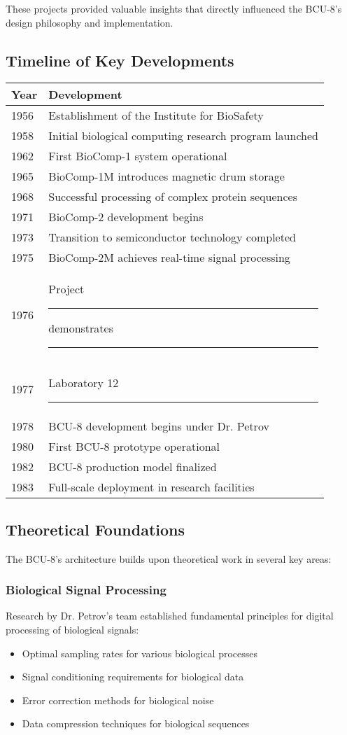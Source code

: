 \documentclass[12pt]{article}
\begin{document}
These projects provided valuable insights that directly influenced the BCU-8's design philosophy and implementation.

\subsection{Timeline of Key Developments}
\begin{center}
\begin{tabular}{|l|l|}
\hline
\textbf{Year} & \textbf{Development} \\
\hline
1956 & Establishment of the Institute for BioSafety \\
1958 & Initial biological computing research program launched \\
1962 & First BioComp-1 system operational \\
1965 & BioComp-1M introduces magnetic drum storage \\
1968 & Successful processing of complex protein sequences \\
1971 & BioComp-2 development begins \\
1973 & Transition to semiconductor technology completed \\
1975 & BioComp-2M achieves real-time signal processing \\
1976 & Project \rule{35mm}{3.5mm} demonstrates \rule{55mm}{3.5mm} \\
1977 & Laboratory 12 \rule{75mm}{3.5mm} \\
1978 & BCU-8 development begins under Dr. Petrov \\
1980 & First BCU-8 prototype operational \\
1982 & BCU-8 production model finalized \\
1983 & Full-scale deployment in research facilities \\
\hline
\end{tabular}
\end{center}

\subsection{Theoretical Foundations}
The BCU-8's architecture builds upon theoretical work in several key areas:

\subsubsection{Biological Signal Processing}
Research by Dr. Petrov's team established fundamental principles for digital processing of biological signals:
\begin{itemize}
    \item Optimal sampling rates for various biological processes
    \item Signal conditioning requirements for biological data
    \item Error correction methods for biological noise
    \item Data compression techniques for biological sequences
\end{itemize}
\end{document}
